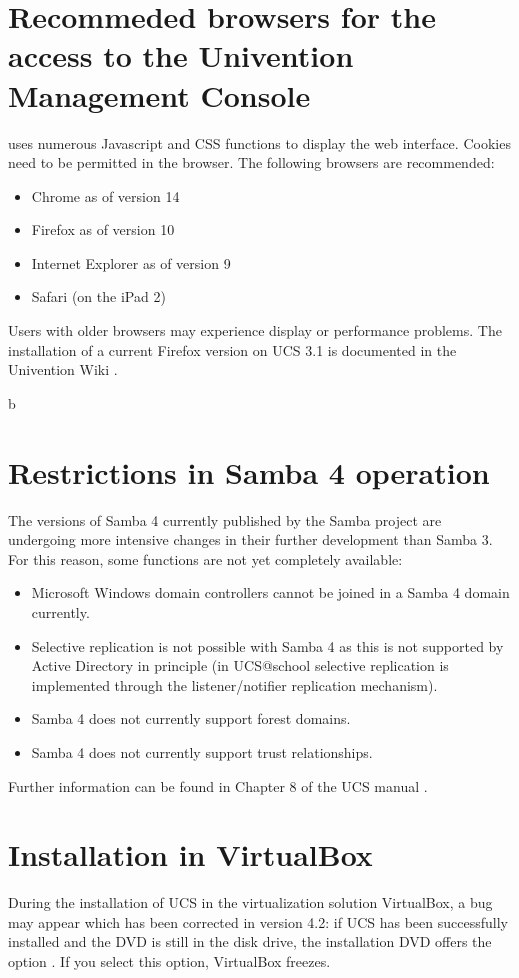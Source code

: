 \section{Recommeded browsers for the access to the Univention Management Console}

\ucsUMC{} uses numerous Javascript and CSS functions to display the
web interface. Cookies need to be permitted in the browser.
The following browsers are recommended:

\begin{itemize}
\item Chrome as of version 14
\item Firefox as of version 10
\item Internet Explorer as of version 9
\item Safari (on the iPad 2)
\end{itemize}

Users with older browsers may experience display or performance
problems. The installation of a current Firefox version on UCS 3.1 is
documented in the Univention Wiki \cite{ucd-firefox7}.

b\section{Restrictions in Samba 4 operation}

The versions of Samba 4 currently published by the Samba project are
undergoing more intensive changes in their further
development than Samba 3. For this reason, some functions are not yet
completely available:

\begin{itemize}
\item Microsoft Windows domain controllers cannot be joined in a Samba
4 domain currently.
\item Selective replication is not possible with Samba 4 as this is
not supported by Active Directory in principle (in UCS@school
selective replication is implemented through the listener/notifier
replication mechanism).

\item Samba 4 does not currently support forest domains. 
\item Samba 4 does not currently support trust relationships.
\end{itemize}

Further information can be found in Chapter 8 of the UCS
manual \cite{UCS-Handbuch}.

\section{Installation in VirtualBox}
During the installation of UCS in the virtualization solution VirtualBox, a bug
may appear which has been corrected in version 4.2: if UCS has been
successfully installed and the DVD is still in the disk drive, the
installation DVD offers the option . If you select this option, VirtualBox freezes. 

